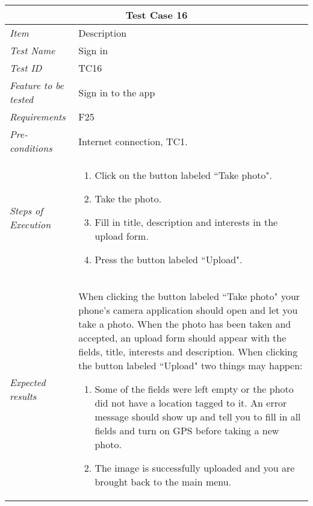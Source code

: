 \begin{minipage}{\linewidth}
\setlength{\tabcolsep}{15pt}
\centering
{}
\begin{tabular}{ |l|p{70mm}| }
	\hline
	\multicolumn{2}{|c|}{\cellcolor{gray!25} \textbf{Test Case 16}} \\
	\hline
	\it{\cellcolor{gray!25}Item} & {\cellcolor{gray!25} Description } \\
	\hline
	\it{\cellcolor{gray!25}Test Name } & Sign in \\ \hline
	\it{\cellcolor{gray!25}Test ID} & TC16 \\ \hline
	\it{\cellcolor{gray!25}Feature to be tested} & Sign in to the app \\ \hline
	\it{\cellcolor{gray!25}Requirements} & F25  \\ \hline
	\it{\cellcolor{gray!25}Pre-conditions} & Internet connection, TC1. \\ \hline
	\it{\cellcolor{gray!25}Steps of Execution} & \begin{enumerate}
	                                       \item Click on the button labeled ``Take photo".
	                                       \item Take the photo.
	                                       \item Fill in title, description and interests in the upload form.
	                                       \item Press the button labeled ``Upload".
	                                     \end{enumerate} \\ \hline
	\it{\cellcolor{gray!25}Expected results} & When clicking the button labeled ``Take photo" your phone’s camera application should open and let you take a photo. When the photo has been taken and accepted, an upload form should appear with the fields, title, interests and description. When clicking the button labeled ``Upload" two things may happen: \begin{enumerate}[label=\alph*)]
	                                       \item Some of the fields were left empty or the photo did not have a location tagged to it. An error message should show up and tell you to fill in all fields and turn on GPS before taking a new photo.
	                                       \item The image is successfully uploaded and you are brought back to the main menu.
	                                     \end{enumerate} \\
	\hline
\end{tabular}
\medskip
\end{minipage}
